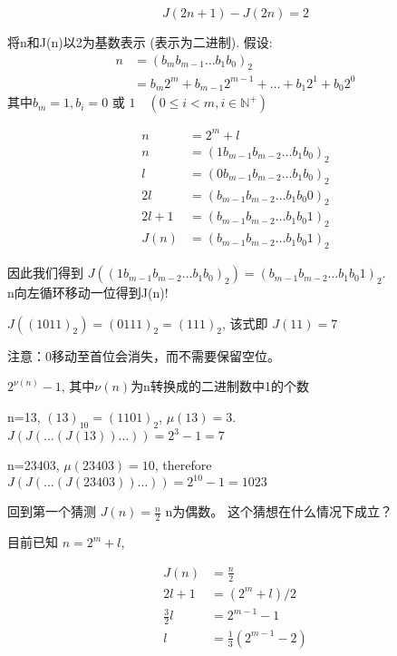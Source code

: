 \documentclass[mode=geye]{elegantnote}
\begin{document}
\begin{equation}\label{JosephRecur1}
	J(2n+1)-J(2n)=2
\end{equation}

\begin{remark}
	将n和J(n)以2为基数表示 (表示为二进制). 假设:\\
	\begin{align*}
		n&=(b_mb_{m-1} \dots b_1 b_0)_2\\
		&=b_m2^m+b_{m-1}2^{m-1}+\dots+b_1 2^1+b_0 2^0
	\end{align*}
其中$ b_m = 1, b_i = 0\text{ 或 }1  \quad(0\leqslant i <m, i\in\mathbb{N}^+)$
\end{remark}

\begin{align*}
	n&=2^m+l\\
	n&=(1 b_{m-1} b_{m-2}\dots b_1 b_0)_2\\
	l&=(0 b_{m-1} b_{m-2}\dots b_1 b_0)_2\\
	2l&=(b_{m-1} b_{m-2}\dots b_1 b_0 0)_2\\
	2l+1&=(b_{m-1} b_{m-2}\dots b_1 b_0 1)_2\\
	J(n)&=(b_{m-1} b_{m-2}\dots b_1 b_0 1)_2
\end{align*}

因此我们得到 $ J((1 b_{m-1} b_{m-2}\dots b_1 b_0)_2)=(b_{m-1} b_{m-2}\dots b_1 b_0 1)_2 $.\\
n向左循环移动一位得到J(n)!\\

\begin{case}
	$ J((1011)_2) = (0111)_2 = (111)_2 $, 该式即 $ J(11) = 7 $
\end{case}
注意：0移动至首位会消失，而不需要保留空位。

$ 2^{\nu(n)}-1 $, 其中$ \nu(n) $为n转换成的二进制数中1的个数

\begin{case}
	n=13, $ (13)_{10} = (1101)_2 $, $ \mu(13) = 3 $.\\
	$ J(J(\dots(J(13))\dots)) = 2^3-1 = 7 $
\end{case}
\begin{case}
	n=23403, $ \mu(23403)=10 $, therefore 	$ J(J(\dots(J(23403))\dots)) = 2^{10}-1 = 1023 $
\end{case}

回到第一个猜测 $ J(n) = \frac{n}{2} $ n为偶数。
这个猜想在什么情况下成立？

目前已知 $ n = 2^m + l $, 

\begin{align*}
	J(n) &= \frac{n}{2}\\
	2l+1 &= (2^m+l)/2\\
	\frac{3}{2} l &=2^{m-1}-1\\
	l&=\frac{1}{3}(2^{m-1}-2)
\end{align*}
\end{document}
